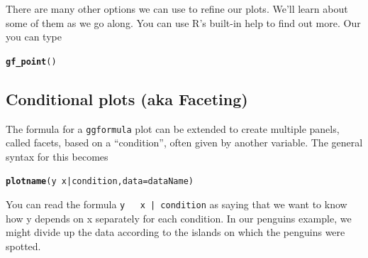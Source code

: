 \documentclass[twoside]{book}\usepackage[]{graphicx}\usepackage[]{xcolor}
\makeatletter
\newcommand{\hlopt}[1]{\textcolor[rgb]{0,0,0}{#1}}%
\newcommand{\hlstd}[1]{\textcolor[rgb]{0.345,0.345,0.345}{#1}}%
\newcommand{\hlkwc}[1]{\textcolor[rgb]{0.333,0.667,0.333}{#1}}%
\newcommand{\hlkwd}[1]{\textcolor[rgb]{0.737,0.353,0.396}{\textbf{#1}}}%
\newenvironment{kframe}{%
 \def\at@end@of@kframe{}%
 \ifinner\ifhmode%
  \def\at@end@of@kframe{\end{minipage}}%
  \begin{minipage}{\columnwidth}%
 \fi\fi%
 \def\FrameCommand##1{\hskip\@totalleftmargin \hskip-\fboxsep
 \colorbox{shadecolor}{##1}\hskip-\fboxsep
     \hskip-\linewidth \hskip-\@totalleftmargin \hskip\columnwidth}%
 \MakeFramed {\advance\hsize-\width
   \@totalleftmargin\z@ \linewidth\hsize
   \@setminipage}}%
 {\par\unskip\endMakeFramed%
 \at@end@of@kframe}
\newenvironment{knitrout}{}{} %
\newcommand{\Rindex}[1]{\index{\texttt{#1}}}
\newcommand{\pkg}[1]{{\color{red!80!black}\texttt{#1}}\Rindex{#1}}
\renewcommand{\code}[1]{{\color{blue!80!black}\texttt{#1}}}
\def\R{{\sf R}}
\newcounter{example}[section]
\makeatother
\begin{document}
There are many other options we can use to refine our plots.  We'll learn about some of them as we 
go along. You can use \R{}'s built-in help to find out more.  Our you can type

\begin{knitrout}
\color{fgcolor}\begin{kframe}
\begin{alltt}
\hlkwd{gf_point}\hlstd{()}
\end{alltt}


{\ttfamily\noindent\itshape{}}\end{kframe}
\end{knitrout}

\subsection{Conditional plots (aka Faceting)}

The formula for a \pkg{ggformula} plot can be extended to create multiple
panels, called facets, based on a ``condition'', often given by another variable. 
The  general syntax for this becomes
\begin{knitrout}
\color{fgcolor}\begin{kframe}
\begin{alltt}
\hlkwd{plotname}\hlstd{( y} \hlopt{~} \hlstd{x} \hlopt{|} \hlstd{condition,} \hlkwc{data} \hlstd{= dataName )}
\end{alltt}
\end{kframe}
\end{knitrout}

You can read the formula \code{y ~ x | condition} as saying that we want to know how y depends on x separately
for each condition.
In our penguins example, we might divide up the data according to the islands on which the penguins were spotted.
\end{document}
